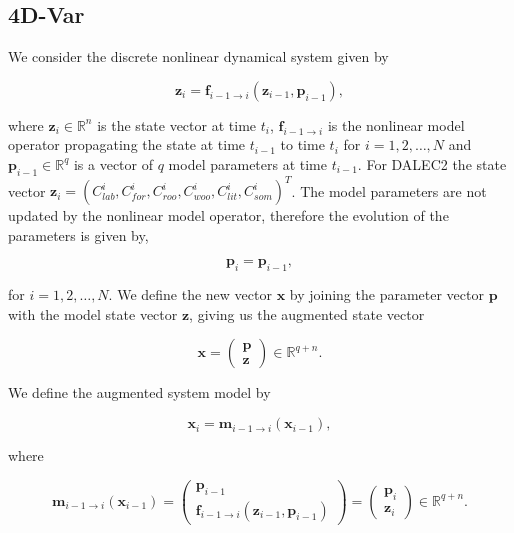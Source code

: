 \documentclass[review]{elsarticle}
\begin{document}
\subsection{4D-Var} \label{4dvar}

We consider the discrete nonlinear dynamical system given by
\begin{linenomath}
\begin{equation}
\textbf{z}_{i} = \textbf{f}_{i-1\rightarrow i}(\textbf{z}_{i-1}, \textbf{p}_{i-1}),
\end{equation}
\end{linenomath}
where \( \textbf{z}_{i} \in \mathbb{R}^{n} \) is the state vector at time \( t_i \), \(\textbf{f}_{i-1 \rightarrow i}\) is the nonlinear model operator propagating the state at time \(t_{i-1}\) to time \(t_{i}\) for \(i = 1, 2, \dots, N\) and \(\textbf{p}_{i-1} \in \mathbb{R}^{q}\) is a vector of \(q\) model parameters at time \(t_{i-1}\). For DALEC2 the state vector \(\textbf{z}_{i}=(C_{lab}^{i}, C_{for}^{i}, C_{roo}^{i}, C_{woo}^{i}, C_{lit}^{i}, C_{som}^{i})^{T}\). The model parameters are not updated by the nonlinear model operator, therefore the evolution of the parameters is given by,
\begin{linenomath}
\begin{equation}
\textbf{p}_{i} = \textbf{p}_{i-1}, 
\end{equation}
\end{linenomath}
for $i= 1, 2, \dots, N$. We define the new vector $\textbf{x}$ by joining the parameter vector $\textbf{p}$ with the model state vector $\textbf{z}$, giving us the augmented state vector
\begin{linenomath}
\begin{equation}
\textbf{x} =
\begin{pmatrix}
\textbf{p} \\
\textbf{z}
\end{pmatrix}
\in \mathbb{R}^{q+n}.
\end{equation}
\end{linenomath}
We define the augmented system model by
\begin{linenomath}
\begin{equation}
\textbf{x}_{i} = \textbf{m}_{i-1 \rightarrow i}(\textbf{x}_{i-1}), \label{eqn:nonlinmod}
\end{equation}
\end{linenomath}
where
\begin{linenomath}
\begin{equation}
\textbf{m}_{i-1\rightarrow i}(\textbf{x}_{i-1}) =
\begin{pmatrix}
\textbf{p}_{i-1} \\
\textbf{f}_{i-1\rightarrow i}(\textbf{z}_{i-1}, \textbf{p}_{i-1})
\end{pmatrix}
=
\begin{pmatrix}
\textbf{p}_{i} \\
\textbf{z}_{i}
\end{pmatrix}
\in \mathbb{R}^{q+n}.
\end{equation}
\end{linenomath}
\end{document}
